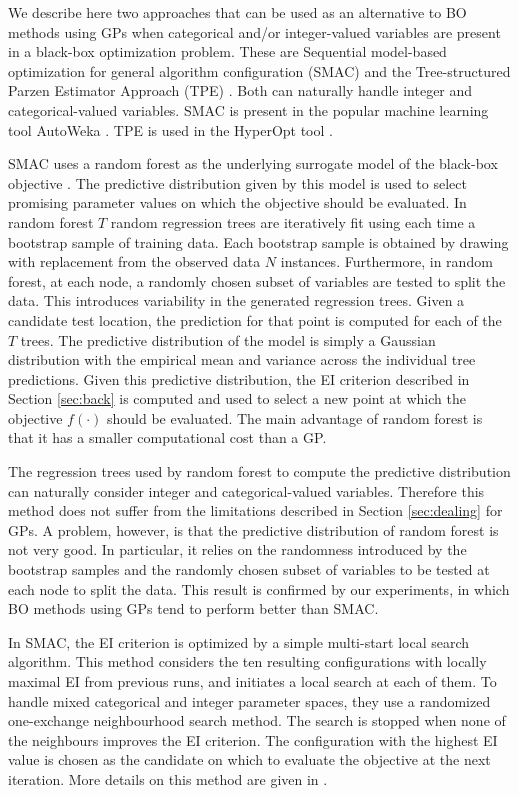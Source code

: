 We describe here two approaches that can be used as an
alternative to BO methods using GPs when categorical and/or
integer-valued variables are present in a black-box optimization problem. These
are Sequential model-based optimization for general algorithm configuration (SMAC) and the Tree-structured Parzen Estimator Approach (TPE)
\citep{hutter2011sequential} \citep{bergstra2011algorithms}. Both can naturally handle integer and categorical-valued
variables. SMAC is present in the popular machine learning tool AutoWeka \citep{thornton2013auto}.
TPE is used in the HyperOpt tool \citep{bergstra2013hyperopt}.

SMAC uses a random forest as the underlying surrogate model of the black-box
objective \citep{breiman2001random}. The predictive distribution given by
this model is used to select promising parameter values on which the objective should
be evaluated. In random forest $T$ random regression trees are iteratively fit using
each time a bootstrap sample of training data. Each bootstrap sample is obtained by drawing
with replacement from the observed data $N$ instances. Furthermore, in random forest, at each node,
a randomly chosen subset of variables are tested to split the data. This introduces variability in
the generated regression trees. Given a candidate test location, the prediction for
that point is computed for each of the $T$ trees. The predictive distribution of the model
is simply a Gaussian distribution with the empirical mean and variance across the individual
tree predictions. Given this predictive distribution, the EI criterion described in Section
\ref{sec:back} is computed and used to select a new point at which the objective $f(\cdot)$ should
be evaluated. The main advantage of random forest is that it has a smaller computational cost than
a GP.

The regression trees used by random forest to compute the predictive
distribution can naturally consider integer and categorical-valued variables.
Therefore this method does not suffer from the limitations described in Section \ref{sec:dealing}
for GPs. A problem, however, is that the predictive distribution of random forest is not
very good. In particular, it relies on the randomness introduced by the bootstrap samples
and the randomly chosen subset of variables to be tested at each node to split the data.
This result is confirmed by our experiments, in which BO methods using GPs tend to
perform better than SMAC.

In SMAC, the EI criterion is optimized by a simple multi-start local search algorithm. This method considers
the ten resulting configurations with locally maximal EI from previous runs, and initiates a local search at each
of them. To handle mixed categorical and integer parameter spaces, they use a randomized one-exchange
neighbourhood search method. The search is stopped when none of the neighbours improves the EI criterion.
The configuration with the highest EI value is chosen as the candidate on which to evaluate the objective at
the next iteration. More details on this method are given in \citep{hutter2011sequential}.

